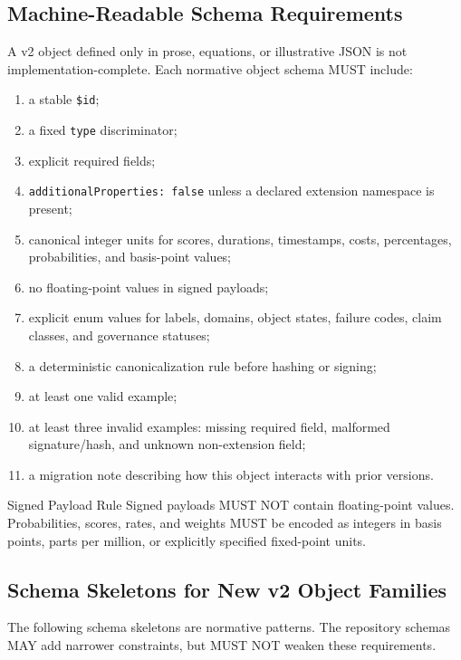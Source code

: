 \documentclass[11pt]{article}
\begin{document}
\subsection{Machine-Readable Schema Requirements}

A v2 object defined only in prose, equations, or illustrative JSON is not implementation-complete. Each normative object schema MUST include:

\begin{enumerate}
    \item a stable \texttt{\$id};
    \item a fixed \texttt{type} discriminator;
    \item explicit required fields;
    \item \texttt{additionalProperties: false} unless a declared extension namespace is present;
    \item canonical integer units for scores, durations, timestamps, costs, percentages, probabilities, and basis-point values;
    \item no floating-point values in signed payloads;
    \item explicit enum values for labels, domains, object states, failure codes, claim classes, and governance statuses;
    \item a deterministic canonicalization rule before hashing or signing;
    \item at least one valid example;
    \item at least three invalid examples: missing required field, malformed signature/hash, and unknown non-extension field;
    \item a migration note describing how this object interacts with prior versions.
\end{enumerate}

\begin{warningbox}{Signed Payload Rule}
Signed payloads MUST NOT contain floating-point values. Probabilities, scores, rates, and weights MUST be encoded as integers in basis points, parts per million, or explicitly specified fixed-point units.
\end{warningbox}

\subsection{Schema Skeletons for New v2 Object Families}

The following schema skeletons are normative patterns. The repository schemas MAY add narrower constraints, but MUST NOT weaken these requirements.
\end{document}
